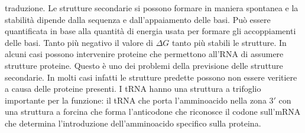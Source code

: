traduzione. Le strutture secondarie si possono formare in maniera spontanea e la stabilit\`a dipende dalla sequenza e dall'appaiamento delle basi. Pu\`o essere quantificata in base 
alla quantit\`a di energia usata per formare gli accoppiamenti delle basi. Tanto pi\`u negativo il valore di $\Delta G$ tanto pi\`u stabili le strutture. In alcuni casi possono 
intervenire proteine che permettono all'RNA di assumere strutture proteine. Questo \`e uno dei problemi della previsione delle strutture secondarie. In molti casi infatti le strutture 
predette possono non essere veritiere a causa delle proteine presenti. I tRNA hanno una struttura a trifoglio importante per la funzione: il tRNA che porta l'amminoacido nella zona 
$3'$ con una struttura a forcina che forma l'anticodone che riconosce il codone sull'mRNA che determina l'introduzione dell'amminoacido specifico sulla proteina.
